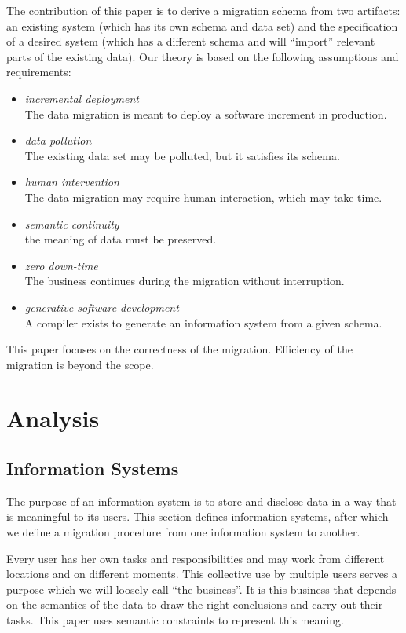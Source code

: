 \documentclass[runningheads]{llncs}
\begin{document}
   The contribution of this paper is to derive a migration schema from two artifacts: an existing system
   (which has its own schema and data set) and the specification of a desired system (which has a different schema and will ``import'' relevant parts of the existing data).   
   Our theory is based on the following assumptions and requirements:
\begin{itemize}
   \item {\em incremental deployment}\\The data migration is meant to deploy a software increment in production.
   \item {\em data pollution}\\The existing data set may be polluted, but it satisfies its schema.
   \item {\em human intervention}\\The data migration may require human interaction, which may take time.
   \item {\em semantic continuity}\\the meaning of data must be preserved.
   \item {\em zero down-time}\\The business continues during the migration without interruption.
   \item {\em generative software development}\\A compiler exists to generate an information system from a given schema.
\end{itemize}
   This paper focuses on the correctness of the migration.
   Efficiency of the migration is beyond the scope.

\section{Analysis}
\label{sct:Analysis}
\subsection{Information Systems}
   The purpose of an information system is to store and disclose data in a way that is meaningful to its users.
   This section defines information systems, after which we define a migration procedure from one information system to another.

   Every user has her own tasks and responsibilities and may work from different locations and on different moments.
   This collective use by multiple users serves a purpose which we will loosely call ``the business''.
   It is this business that depends on the semantics of the data to draw the right conclusions and carry out their tasks.
   This paper uses semantic constraints to represent this meaning.
   
\end{document}
